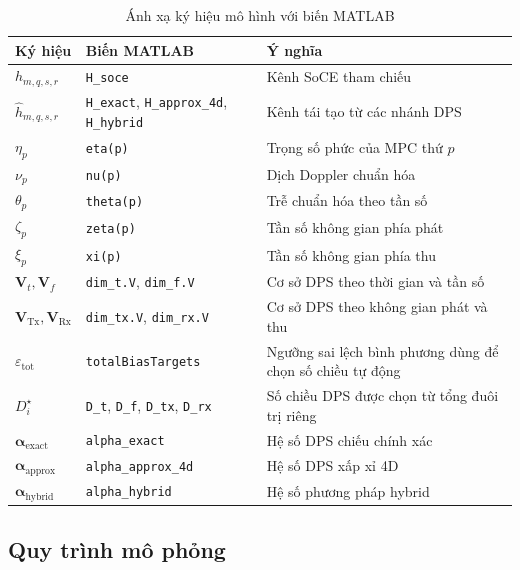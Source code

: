 \begin{table}[H]
    \centering
    \small
    \caption{Ánh xạ ký hiệu mô hình với biến MATLAB}
    \label{tab:ch3_variable_mapping}
    \begin{tabularx}{\textwidth}{l l X}
        \toprule
        Ký hiệu & Biến MATLAB & Ý nghĩa \\
        \midrule
        \(h_{m,q,s,r}\) & \texttt{H\_soce} & Kênh SoCE tham chiếu \\
        \(\hat{h}_{m,q,s,r}\) & \texttt{H\_exact}, \texttt{H\_approx\_4d}, \texttt{H\_hybrid} & Kênh tái tạo từ các nhánh DPS \\
        \(\eta_p\) & \texttt{eta(p)} & Trọng số phức của MPC thứ \(p\) \\
        \(\nu_p\) & \texttt{nu(p)} & Dịch Doppler chuẩn hóa \\
        \(\theta_p\) & \texttt{theta(p)} & Trễ chuẩn hóa theo tần số \\
        \(\zeta_p\) & \texttt{zeta(p)} & Tần số không gian phía phát \\
        \(\xi_p\) & \texttt{xi(p)} & Tần số không gian phía thu \\
        \(\mathbf{V}_t,\mathbf{V}_f\) & \texttt{dim\_t.V}, \texttt{dim\_f.V} & Cơ sở DPS theo thời gian và tần số \\
        \(\mathbf{V}_{\mathrm{Tx}},\mathbf{V}_{\mathrm{Rx}}\) & \texttt{dim\_tx.V}, \texttt{dim\_rx.V} & Cơ sở DPS theo không gian phát và thu \\
        \(\varepsilon_{\mathrm{tot}}\) & \texttt{totalBiasTargets} & Ngưỡng sai lệch bình phương dùng để chọn số chiều tự động \\
        \(D_i^{\star}\) & \texttt{D\_t}, \texttt{D\_f}, \texttt{D\_tx}, \texttt{D\_rx} & Số chiều DPS được chọn từ tổng đuôi trị riêng \\
        \(\boldsymbol{\alpha}_{\mathrm{exact}}\) & \texttt{alpha\_exact} & Hệ số DPS chiếu chính xác \\
        \(\boldsymbol{\alpha}_{\mathrm{approx}}\) & \texttt{alpha\_approx\_4d} & Hệ số DPS xấp xỉ 4D \\
        \(\boldsymbol{\alpha}_{\mathrm{hybrid}}\) & \texttt{alpha\_hybrid} & Hệ số phương pháp hybrid \\
        \bottomrule
    \end{tabularx}
\end{table}

\subsection{Quy trình mô phỏng}
\label{subsec:ch3_simulation_flow}

